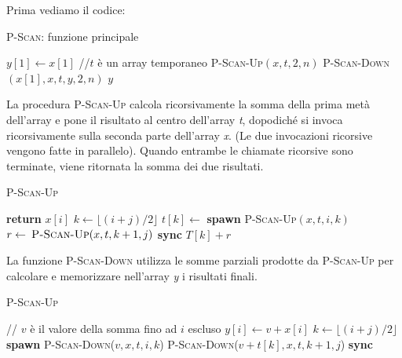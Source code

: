 Prima vediamo il codice:

\begin{breakablealgorithm}
	\caption{\textsc{P-Scan}: funzione principale}
	\begin{algorithmic}[1]
    \State $y[1] \gets x[1]$
        \State //$t$ è un array temporaneo
        \State \textsc{P-Scan-Up}$(x, t, 2, n)$
        \State \textsc{P-Scan-Down}$(x[1], x, t, y, 2, n)$
    \EndIf
    \State \Return $y$
\EndFunction
\end{algorithmic}
\end{breakablealgorithm}

La procedura \textsc{P-Scan-Up} calcola ricorsivamente la somma della prima metà dell'array e pone il risultato al centro dell'array \emph{t}, dopodiché si invoca ricorsivamente sulla seconda parte dell'array \emph{x}. (Le due invocazioni ricorsive vengono fatte in parallelo).
Quando entrambe le chiamate ricorsive sono terminate, viene ritornata la somma dei due risultati.


\begin{breakablealgorithm}
	\caption{\textsc{P-Scan-Up}}
	\begin{algorithmic}[1]
        \State \textbf{return} $ x[i]$
    \EndIf
   \State $k \gets \lfloor (i+j)/2\rfloor$
   \State $t[k] \gets $ \textbf{spawn} \textsc{P-Scan-Up}$(x,t,i,k)$
    \State $r \gets \: \textsc{P-Scan-Up}(x,t,k+1,j)$
    \State \textbf{sync}
    \State \Return $T[k]+r$
\EndFunction
\end{algorithmic}
\end{breakablealgorithm}

La funzione \textsc{P-Scan-Down} utilizza le somme parziali prodotte da \textsc{P-Scan-Up} per calcolare e memorizzare nell'array \textit{y} i risultati finali.

\begin{breakablealgorithm}
		\caption{\textsc{P-Scan-Up}}
		\begin{algorithmic}[1]
    \State // $ v $ è il valore della somma fino ad $ i $ escluso
        \State $y[i] \gets v+x[i]$
    \Else
        \State $ k \gets \lfloor(i+j)/2\rfloor$
        \State \textbf{spawn} \textsc{P-Scan-Down}($v,x,t,i,k$)
        \State \textsc{P-Scan-Down}($v+t[k],x,t,k+1,j$)
        \State \textbf{sync}
    \EndIf
\EndFunction
\end{algorithmic}
\end{breakablealgorithm}

